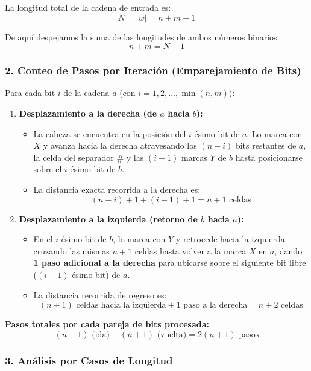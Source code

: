 La longitud total de la cadena de entrada es:
\[ N = |w| = n + m + 1 \]

De aquí despejamos la suma de las longitudes de ambos números binarios:
\[ n + m = N - 1 \]

\subsubsection*{2. Conteo de Pasos por Iteración (Emparejamiento de Bits)}

Para cada bit $i$ de la cadena $a$ (con $i = 1, 2, \dots, \min(n, m)$):

\begin{enumerate}[label=\arabic*., leftmargin=*]
    \item \textbf{Desplazamiento a la derecha (de $a$ hacia $b$):}
    \begin{itemize}[leftmargin=*]
        \item La cabeza se encuentra en la posición del $i$-ésimo bit de $a$. Lo marca con $X$ y avanza hacia la derecha atravesando los $(n - i)$ bits restantes de $a$, la celda del separador $\#$ y las $(i - 1)$ marcas $Y$ de $b$ hasta posicionarse sobre el $i$-ésimo bit de $b$.
        \item La distancia exacta recorrida a la derecha es:
        \[ (n - i) + 1 + (i - 1) + 1 = n + 1 \text{ celdas} \]
    \end{itemize}
    
    \item \textbf{Desplazamiento a la izquierda (retorno de $b$ hacia $a$):}
    \begin{itemize}[leftmargin=*]
        \item En el $i$-ésimo bit de $b$, lo marca con $Y$ y retrocede hacia la izquierda cruzando las mismas $n + 1$ celdas hasta volver a la marca $X$ en $a$, dando \textbf{1 paso adicional a la derecha} para ubicarse sobre el siguiente bit libre ($(i+1)$-ésimo bit) de $a$.
        \item La distancia recorrida de regreso es:
        \[ (n + 1) \text{ celdas hacia la izquierda} + 1 \text{ paso a la derecha} = n + 2 \text{ celdas} \]
    \end{itemize}
\end{enumerate}

\noindent\textbf{Pasos totales por cada pareja de bits procesada:}
\[ (n + 1) \text{ (ida)} + (n + 1) \text{ (vuelta)} = 2(n + 1) \text{ pasos} \]

\subsubsection*{3. Análisis por Casos de Longitud}

